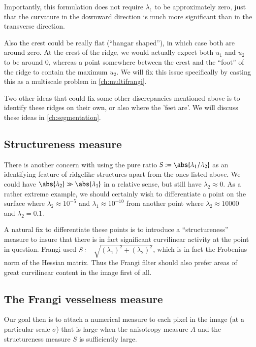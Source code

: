 Importantly, this formulation does not require $\lambda_1$ to be approximately zero, just that the curvature in the downward direction is much more significant than in the transverse direction.

Also the crest could be really flat (``hangar shaped''), in which case both are around zero. At the crest of the ridge, we would actually expect both $u_1$ and $u_2$ to be around 0, whereas a point somewhere between the crest and the ``foot'' of the ridge to contain the maximum $u_2$. We will fix this issue specifically by casting this as a multiscale problem in \cref{ch:multifrangi}.

Two other ideas that could fix some other discrepancies mentioned above is to identify these ridges on their own, or also where the 'feet are'. We will discuss these ideas in \cref{ch:segmentation}.

\subsection{Structureness measure} \label{sec:frangi-structureness}

There is another concern with using the pure ratio $S:= \abs{\lambda_1 / \lambda_2}$ as an identifying feature of ridgelike structures apart from the ones listed above. We could have $\abs{\lambda_2} \gg \abs{\lambda_1}$ in a relative sense, but still have $\lambda_2 \approx 0$. As a rather extreme example, we should certainly wish to differentiate a point on the surface where $\lambda_2 \approx 10^{-5} $ and $\lambda_1 \approx 10^{-10}$ from another point where $\lambda_2 \approx 10000$ and $\lambda_2 = 0.1$.

A natural fix to differentiate these points is to introduce a ``structureness'' measure to insure that there is in fact significant curvilinear activity at the point in question. Frangi used $S:= \sqrt{(\lambda_1)^2 + (\lambda_2)^2}$, which is in fact the Frobenius norm of the Hessian matrix. Thus the Frangi filter should also prefer areas of
great curvilinear content in the image first of all.


\subsection{The Frangi vesselness measure}

Our goal then is to attach a numerical measure to each pixel in the image (at a particular scale $\sigma$) that is large when the anisotropy measure $A$ and the structureness measure $S$ is sufficiently large.


